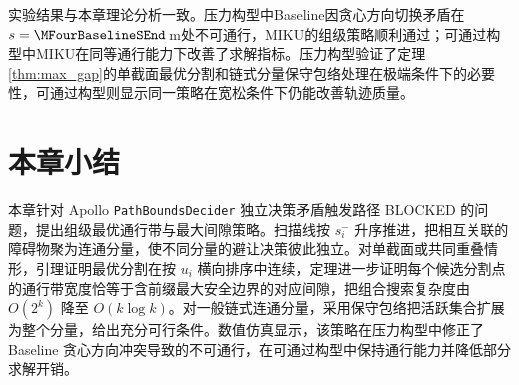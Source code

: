 实验结果与本章理论分析一致。压力构型中Baseline因贪心方向切换矛盾在$s=\MFourBaselineSEnd$\,m处不可通行，MIKU的组级策略顺利通过；可通过构型中MIKU在同等通行能力下改善了求解指标。压力构型验证了定理\ref{thm:max_gap}的单截面最优分割和链式分量保守包络处理在极端条件下的必要性，可通过构型则显示同一策略在宽松条件下仍能改善轨迹质量。

\section{本章小结}

本章针对 Apollo \texttt{PathBoundsDecider} 独立决策矛盾触发路径 BLOCKED 的问题，提出组级最优通行带与最大间隙策略。扫描线按 $s_i^{-}$ 升序推进，把相互关联的障碍物聚为连通分量，使不同分量的避让决策彼此独立。对单截面或共同重叠情形，引理证明最优分割在按 $u_i$ 横向排序中连续，定理进一步证明每个候选分割点的通行带宽度恰等于含前缀最大安全边界的对应间隙，把组合搜索复杂度由 $O(2^k)$ 降至 $O(k\log k)$。对一般链式连通分量，采用保守包络把活跃集合扩展为整个分量，给出充分可行条件。数值仿真显示，该策略在压力构型中修正了 Baseline 贪心方向冲突导致的不可通行，在可通过构型中保持通行能力并降低部分求解开销。
